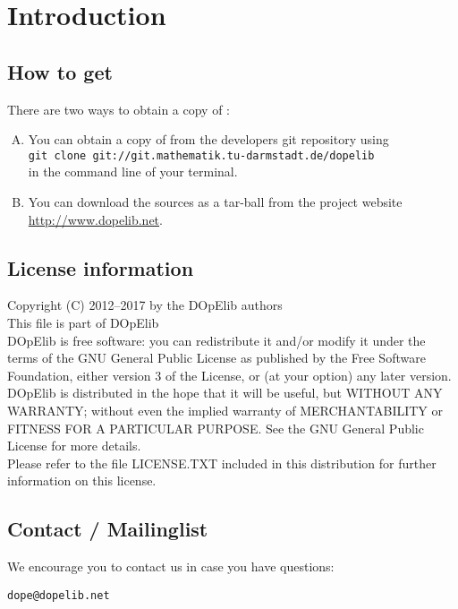 \chapter{Introduction}\label{chap:intro}
\section{How to get \dope{}}\label{sec:obtain}
There are two ways to obtain a copy of \dope{}:\\

\begin{enumerate}[A)]
\item You can obtain a copy of \dope{} from the developers git repository using\\
\texttt{git clone git://git.mathematik.tu-darmstadt.de/dopelib} \\
in the command line of your terminal.


%
\item You can download the sources as a tar-ball from the project website\\ 
\url{http://www.dopelib.net}.
\end{enumerate}


\section{License information}
Copyright (C) 2012--2017 by the DOpElib authors\\[2mm]
%
This file is part of DOpElib\\[2mm]
%
DOpElib is free software: you can redistribute it
and/or modify it under the terms of the GNU General Public
License as published by the Free Software Foundation, either
version 3 of the License, or (at your option) any later
version.\\[2mm]
%
DOpElib is distributed in the hope that it will be
useful, but WITHOUT ANY WARRANTY; without even the implied
warranty of MERCHANTABILITY or FITNESS FOR A PARTICULAR
PURPOSE.  See the GNU General Public License for more
details.\\[2mm]
%
Please refer to the file LICENSE.TXT included in this distribution
for further information on this license.


\section{Contact / Mailinglist}
We encourage you to contact us in case you have questions:
\begin{verbatim}
dope@dopelib.net 
\end{verbatim}



